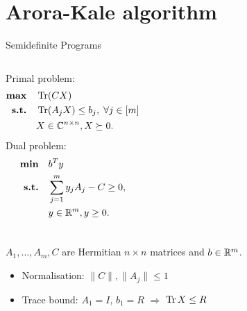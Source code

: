 
\section{Arora-Kale algorithm}

\begin{frame}{Semidefinite Programs}
 \begin{columns}
  Primal problem:
  \begin{align*}
    \textbf{max} & \quad \operatorname{Tr}(CX) \\
    \textbf{s.t.} & \quad \operatorname{Tr}(A_j X) \leq b_j,\;\forall j \in [m] \\
		      & \quad X\in\mathbb{C}^{n\times n}, X \succeq 0.
  \end{align*}
  Dual problem:
  \begin{align*}
    \textbf{min} & \quad b^T y \\
    \textbf{s.t.} & \quad \sum_{j=1}^m y_j A_j - C \geq 0, \\
		      & \quad y \in\mathbb{R}^m, y \geq 0.
  \end{align*}
 \end{columns}
 
 \vspace{2\floatsep}
 
 $A_1,\dots,A_m,C$ are Hermitian $n\times n$ matrices and $b\in\mathbb{R}^m$.
 
 \vspace{\floatsep}
 
 \begin{itemize}
  \item Normalisation: $\|C\|, \|A_j\| \leq 1$
  \item Trace bound: $A_1 = I$, $b_1 = R$ $\Rightarrow$ $\operatorname{Tr} X \leq R$
 \end{itemize}

\end{frame}


